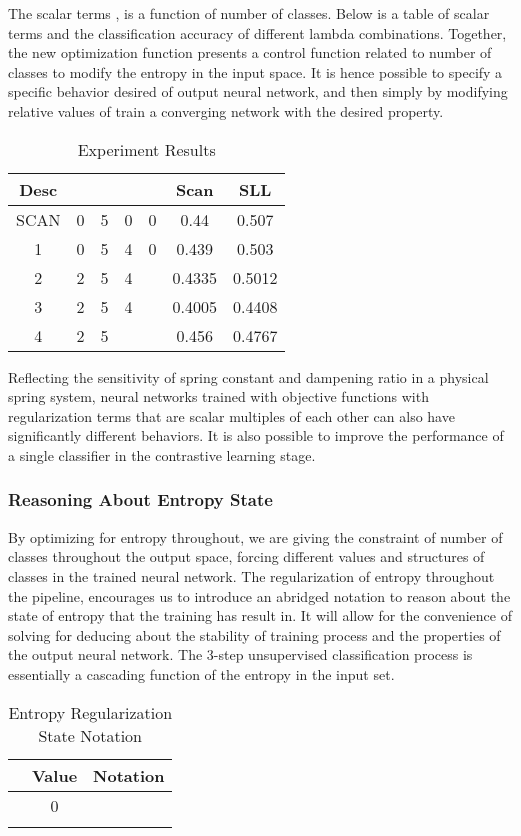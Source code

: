 \documentclass[10pt,twocolumn,letterpaper]{article}
\begin{document}
The scalar terms  , is a function of number of classes. Below is a table of scalar terms and the classification accuracy of different lambda combinations. Together, the new optimization function presents a control function related to number of classes to modify the entropy in the input space. It is hence possible to specify a specific behavior desired of output neural network, and then simply by modifying relative values of   train a converging network with the desired property.
\begin{table}[h]
\caption{Experiment Results}
\label{tab:tabela1}
\begin{tabular}{|c|c|c|c|c|c|c|}
\hline
Desc &  &  &  &  & Scan & SLL  \\ \hline
SCAN & 0 & 5 & 0 & 0 & 0.44 & 0.507       \\
1 & 0 & 5 & 4 & 0 & 0.439 & 0.503 \\
2 & 2 & 5 & 4 &  & 0.4335 & 0.5012 \\
3 & 2 & 5 & 4 &  & 0.4005 & 0.4408 \\
4 & 2 & 5 &  &  & 0.456 & 0.4767 \\
\hline
\end{tabular}
\end{table}

Reflecting the sensitivity of spring constant and dampening ratio in a physical spring system, neural networks trained with objective functions with regularization terms that are scalar multiples of each other can also have significantly different behaviors. It is also possible to improve the performance of a single classifier in the contrastive learning stage.


\subsubsection{Reasoning About Entropy State}
 By optimizing for entropy throughout, we are giving the constraint of number of classes throughout the output space, forcing different values and structures of classes in the trained neural network. The regularization of entropy throughout the pipeline, encourages us to introduce an abridged notation to reason about the state of entropy that the training has result in. It will allow for the convenience of solving for deducing about the stability of training process and the properties of the output neural network. The 3-step unsupervised classification process is essentially a cascading function of the entropy in the input set. 

\begin{table}[h]
\centering
\caption{Entropy Regularization State Notation}
\label{tab:tabela1}
\begin{tabular}{|c|c|c|}
\hline
 & Value & Notation \\ \hline
 & 0 &  \\
 &  &  \\
\hline
\end{tabular}
\end{table}
\end{document}
